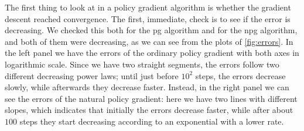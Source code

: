 The first thing to look at in a policy gradient algorithm is whether the gradient descent reached convergence. The first, immediate, check is to see if the error is decreasing. We checked this both for the \acrshort{pg} algorithm and for the \acrshort{npg} algorithm, and both of them were decreasing, as we can see from the plots of \autoref{fig:errors}. In the left panel we have the errors of the ordinary policy gradient with both axes in logarithmic scale. Since we have two straight segments, the errors follow two different decreasing power laws; until just before $10^2$ steps, the errors decrease slowly, while afterwards they decrease faster.
Instead, in the right panel we can see the errors of the natural policy gradient: here we have two lines with different slopes, which indicates that initially the errors decrease faster, while after about $100$ steps they start decreasing according to an exponential with a lower rate.

